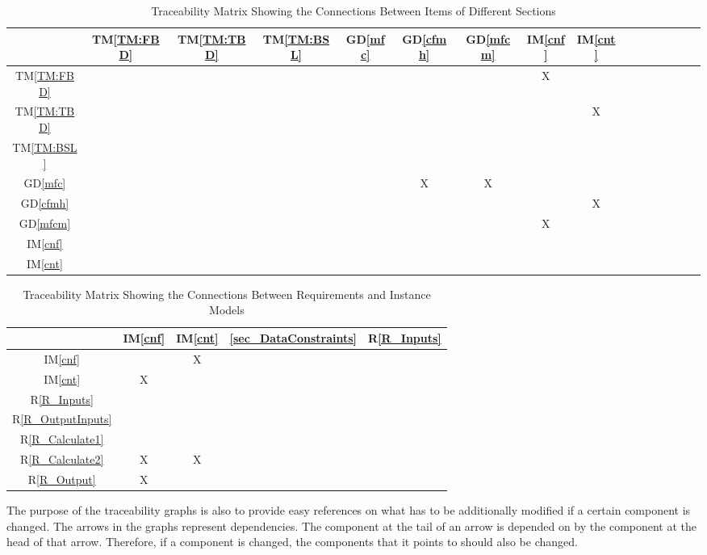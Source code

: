 \documentclass[12pt]{article}
\newcommand{\dref}[1]{GD\ref{#1}}
\newcommand{\tref}[1]{TM\ref{#1}}
\newcommand{\iref}[1]{IM\ref{#1}}
\newcommand{\rref}[1]{R\ref{#1}}
\begin{document}
\begin{table}[h!]
\centering
\begin{tabular}{|c|c|c|c|c|c|c|c|c|c|c|c|c|c|c|c|}
\hline        
	& \tref{TM:FBD}& \tref{TM:TBD}& \tref{TM:BSL}& \dref{mfc}&\dref{cfmh} &\dref{mfcm} & \iref{cnf}& \iref{cnt} \\
\hline
\tref{TM:FBD}   & & & & & & & X&  \\ \hline
\tref{TM:TBD}   & & & & & & & & X \\ \hline
\tref{TM:BSL}   & & & & & & & & \\ \hline
\dref{mfc}      & & & & &  X& X& &  \\ \hline
\dref{cfmh}     & & & & & & & & X \\ \hline
\dref{mfcm}     & & & & & & & X&  \\ \hline
\iref{cnf}      & & & & & & & &   \\ \hline
\iref{cnt}      & & & & & & & &  \\\hline
\end{tabular}
\caption{Traceability Matrix Showing the Connections Between Items of Different Sections}
\label{Table:trace}
\end{table}

\begin{table}[h!]
\centering
\begin{tabular}{|c|c|c|c|c|}
\hline
	& \iref{cnf}& \iref{cnt}& \ref{sec_DataConstraints}& \rref{R_Inputs} \\
\hline
\iref{cnf}            & & X& &   \\ \hline
\iref{cnt}            & X& & & \\ \hline
\rref{R_Inputs}     & & & & \\ \hline
\rref{R_OutputInputs}    & & & &  \\ \hline
\rref{R_Calculate1}   & & & & \\ \hline
\rref{R_Calculate2}  & X& X& &\\ \hline
\rref{R_Output}     & X& & &  \\ \hline 


\end{tabular}
\caption{Traceability Matrix Showing the Connections Between Requirements and Instance Models}
\label{Table:R_trace}
\end{table}

The purpose of the traceability graphs is also to provide easy references on
what has to be additionally modified if a certain component is changed.  The
arrows in the graphs represent dependencies. The component at the tail of an
arrow is depended on by the component at the head of that arrow. Therefore, if a
component is changed, the components that it points to should also be
changed.
\end{document}
